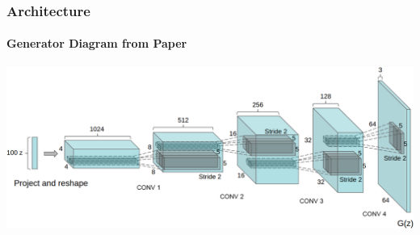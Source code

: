 \documentclass{beamer}
\begin{document}

\begin{frame}[allowframebreaks]
\frametitle{Architecture}
\framesubtitle{Generator Diagram from Paper \cite{repLearnDcgan}}
\includegraphics[scale=0.2]{generator-diagram}
\end{frame}
\end{document}
